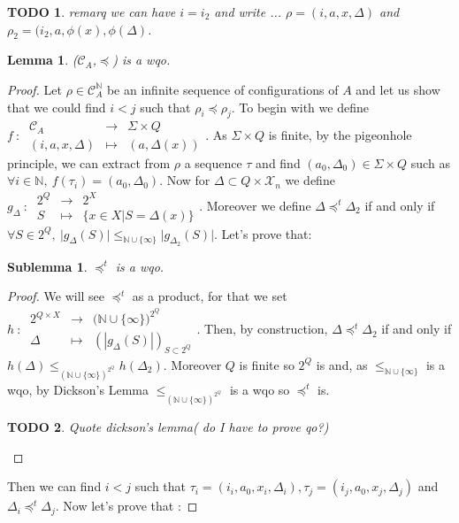 \documentclass[a4paper,10pt]{report}
\newtheorem{lm}{Lemma}[thr]
\newtheorem{slm}{Sublemma}[lm]
\newtheorem{td}{TODO}
\newcommand{\dmap}[5]{
#1~:~\begin{array}{ccccc}
#2 &\to& #3 \\
#4  &\mapsto& #5
\end{array}}
\newcommand{\C}{\mathcal{C}_{A}}
\newcommand{\X}{\mathcal{X}_{n}}
\begin{document}
\begin{td}
 remarq we can have $i=i_2$ and write ... $\rho=( i,a ,x, \Delta  )$ and $\rho_2=( i_2,a ,\phi(x), \phi(\Delta)$.
\end{td}


\begin{lm} \label{cd1}
  ($\C$,$\preceq$) is a wqo.
\end{lm}

\begin {proof}
Let $\rho \in \C^{\mathbb N}$ be an infinite sequence of configurations of $A$ and let us show that we could find $i < j$ such that $\rho_i \preceq \rho_j$.
To begin with we define
$\dmap{f}{\C}{\Sigma \times Q}{(i,a,x,\Delta)}{(a,\Delta(x))}$.
As $\Sigma \times Q$ is finite, by the pigeonhole principle, we can extract from $\rho$ a sequence $\tau$ and find $(a_0,\Delta_0) \in \Sigma \times Q$ such as 
$\forall i \in \mathbb N,\ f(\tau_i)=(a_0,\Delta_0)$.
Now for $\Delta \subset Q \times \X $ we define $\dmap{g_\Delta}{2^Q}{2^X}{S}{\{ x \in X | S=\Delta(x) \}} .$
Moreover we define $\Delta \preceq^t \Delta_2$ if and only if $\forall S \in 2^Q,\ \lvert g_\Delta(S) \lvert \leq_{\mathbb N \cup \{\infty\}} \lvert g_{\Delta_2}(S) \lvert$. Let's prove that: 
\begin{slm}
  $\preceq^t$ is a wqo.
\end{slm}
\begin{proof}
We will see $\preceq^t$ as a product, for that we set $ \dmap{h}{2^{Q\times X}}{({\mathbb N \cup \{\infty\})}^{2^Q}}{\Delta}{(|g_{\Delta}(S)|)_{S\subset {2^Q} }}.$
Then, by construction, $\Delta \preceq^t \Delta_2$ if and only if $ h(\Delta) \leq_{{(\mathbb N \cup \{\infty\})}^{2^Q}} h(\Delta_2)$.
Moreover $Q$ is finite so $2^Q$ is and, as $\leq_{\mathbb N \cup \{\infty\}}$ is a wqo, by Dickson's Lemma $\leq_{{(\mathbb N \cup \{\infty\})}^{2^Q}}$
is a wqo so $\preceq^t$ is.
\begin{td}
  Quote dickson's lemma( do I have to prove qo?) 
\end{td}
\end{proof}
Then we can find $i < j$ such that $\tau_i=(i_i,a_0,x_i,\Delta_i), \tau_j=(i_j,a_0,x_j,\Delta_j)$ and $\Delta_i \preceq^t \Delta_j$.
Now let's prove that :


\end{proof}
\end{document}
